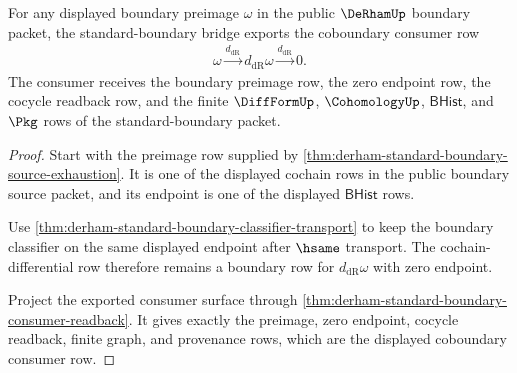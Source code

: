 \begin{theorem}
\label{thm:derham-standard-boundary-coboundary-consumer-example}
For any displayed boundary preimage $\omega$ in the public $\DeRhamUp$
boundary packet, the standard-boundary bridge exports the coboundary consumer
row
$$
\begin{gathered}
\omega
\xrightarrow{d_{\mathrm{dR}}}
d_{\mathrm{dR}}\omega
\xrightarrow{d_{\mathrm{dR}}}
0 .
\end{gathered}
$$
The consumer receives the boundary preimage row, the zero endpoint row, the
cocycle readback row, and the finite $\DiffFormUp$, $\CohomologyUp$,
$\mathsf{BHist}$, and $\Pkg$ rows of the standard-boundary packet.
\end{theorem}
\begin{proof}
Start with the preimage row supplied by
\autoref{thm:derham-standard-boundary-source-exhaustion}. It is one of the
displayed cochain rows in the public boundary source packet, and its endpoint is
one of the displayed $\mathsf{BHist}$ rows.

Use \autoref{thm:derham-standard-boundary-classifier-transport} to keep the
boundary classifier on the same displayed endpoint after $\hsame$ transport.
The cochain-differential row therefore remains a boundary row for
$d_{\mathrm{dR}}\omega$ with zero endpoint.

Project the exported consumer surface through
\autoref{thm:derham-standard-boundary-consumer-readback}. It gives exactly the
preimage, zero endpoint, cocycle readback, finite graph, and provenance rows,
which are the displayed coboundary consumer row.
\end{proof}

